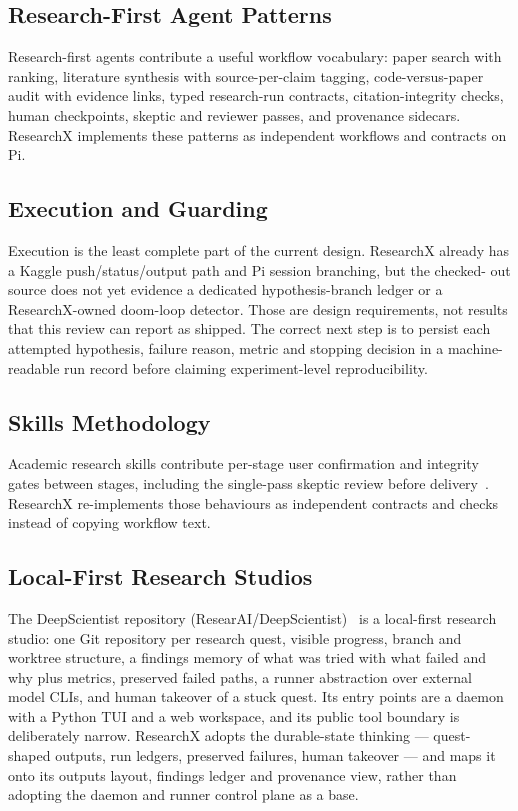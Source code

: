 \documentclass[12pt,a4paper]{report}
\numberwithin{equation}{chapter}
\begin{document}
\subsection{Research-First Agent Patterns}
Research-first agents contribute a useful workflow vocabulary: paper search
with ranking, literature synthesis with source-per-claim tagging,
code-versus-paper audit with evidence links, typed research-run contracts,
citation-integrity checks, human checkpoints, skeptic and reviewer passes, and
provenance sidecars. ResearchX implements these patterns as independent
workflows and contracts on Pi.

\subsection{Execution and Guarding}
Execution is the least complete part of the current design. ResearchX already
has a Kaggle push/status/output path and Pi session branching, but the checked-
out source does not yet evidence a dedicated hypothesis-branch ledger or a
ResearchX-owned doom-loop detector. Those are design requirements, not results
that this review can report as shipped. The correct next step is to persist
each attempted hypothesis, failure reason, metric and stopping decision in a
machine-readable run record before claiming experiment-level reproducibility.

\subsection{Skills Methodology}
Academic research skills contribute per-stage user confirmation and integrity
gates between stages, including the single-pass skeptic review before
delivery~\cite{ars}. ResearchX re-implements those behaviours as independent
contracts and checks instead of copying workflow text.

\subsection{Local-First Research Studios}
The DeepScientist repository (ResearAI/DeepScientist)~\cite{deepscientist}
is a local-first research studio: one Git repository per research quest,
visible progress, branch and worktree structure, a findings memory of what
was tried with what failed and why plus metrics, preserved failed paths, a
runner abstraction over external model CLIs, and human takeover of a stuck
quest. Its entry points are a daemon with a Python TUI and a web workspace,
and its public tool boundary is deliberately narrow. ResearchX adopts the
durable-state thinking --- quest-shaped outputs, run ledgers, preserved
failures, human takeover --- and maps it onto its outputs layout, findings
ledger and provenance view, rather than adopting the daemon and runner
control plane as a base.
\end{document}
